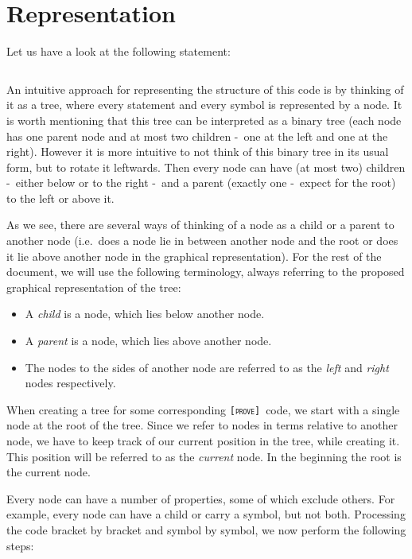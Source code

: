 \documentclass[british]{article}
\newenvironment{code}{\captionsetup{type=listing}}{}
\newcommand\prv{bc}
\newcommand\name{\texttt{\textsc{[prove]}}}
\begin{document}
\section{Representation}

Let us have a look at the following statement:

\begin{code}
\label{code:ex1}
\inputminted[linenos]{\prv}{examples/exmp1.prove}
\end{code}

An intuitive approach for representing the structure of this code is by thinking
of it as a tree, where every statement and every symbol is represented by a
node. It is worth mentioning that this tree can be interpreted as a binary tree
(each node has one parent node and at most two children -\ one at the left and
one at the right). However it is more intuitive to not think of this binary tree
in its usual form, but to rotate it leftwards. Then every node can have (at most
two) children -\ either below or to the right -\ and a parent (exactly one -\
expect for the root) to the left or above it.

As we see, there are several ways of thinking of a node as a child or a parent
to another node (i.e.\ does a node lie in between another node and the root or
does it lie above another node in the graphical representation). For the rest of
the document, we will use the following terminology, always referring to the
proposed graphical representation of the tree:

\begin{itemize}
	\item
		A \emph{child} is a node, which lies below another node.
	\item
		A \emph{parent} is a node, which lies above another node.
	\item
		The nodes to the sides of another node are referred to as the
		\emph{left} and \emph{right} nodes respectively.
\end{itemize}

When creating a tree for some corresponding \name\ code, we start with a single
node at the root of the tree. Since we refer to nodes in terms relative to
another node, we have to keep track of our current position in the tree, while
creating it. This position will be referred to as the \emph{current} node. In
the beginning the root is the current node.

Every node can have a number of properties, some of which exclude others. For
example, every node can have a child or carry a symbol, but not both. Processing
the code bracket by bracket and symbol by symbol, we now perform the following
steps:
\end{document}
